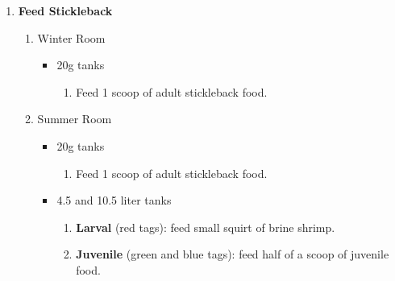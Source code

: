 \documentclass[
  letterpaper,
  DIV=11,
  numbers=noendperiod]{scrreprt}
\providecommand{\tightlist}{%
  \setlength{\itemsep}{0pt}\setlength{\parskip}{0pt}}\usepackage{longtable,booktabs,array}
\begin{document}
\begin{enumerate}
\def\labelenumi{\arabic{enumi}.}
\setcounter{enumi}{2}
\item
  \textbf{Feed Stickleback}

  \begin{enumerate}
  \def\labelenumii{\arabic{enumii}.}
  \tightlist
  \item
    Winter Room

    \begin{itemize}
    \tightlist
    \item
      20g tanks

      \begin{enumerate}
      \def\labelenumiii{\arabic{enumiii}.}
      \tightlist
      \item
        Feed 1 scoop of adult stickleback food.
      \end{enumerate}
    \end{itemize}
  \item
    Summer Room

    \begin{itemize}
    \tightlist
    \item
      20g tanks

      \begin{enumerate}
      \def\labelenumiii{\arabic{enumiii}.}
      \tightlist
      \item
        Feed 1 scoop of adult stickleback food.
      \end{enumerate}
    \item
      4.5 and 10.5 liter tanks

      \begin{enumerate}
      \def\labelenumiii{\arabic{enumiii}.}
      \tightlist
      \item
        \textbf{Larval} (red tags): feed small squirt of brine shrimp.
      \item
        \textbf{Juvenile} (green and blue tags): feed half of a scoop of
        juvenile food.
      \end{enumerate}
    \end{itemize}
  \end{enumerate}

  \begin{tcolorbox}[enhanced jigsaw, toprule=.15mm, breakable, coltitle=black, leftrule=.75mm, title=\textcolor{quarto-callout-warning-color}{\faExclamationTriangle}\hspace{0.5em}{NOTES}, bottomrule=.15mm, toptitle=1mm, bottomtitle=1mm, colframe=quarto-callout-warning-color-frame, opacityback=0, colback=white, opacitybacktitle=0.6, colbacktitle=quarto-callout-warning-color!10!white, rightrule=.15mm, titlerule=0mm, arc=.35mm, left=2mm]


\end{tcolorbox}
\end{enumerate}
\end{document}
